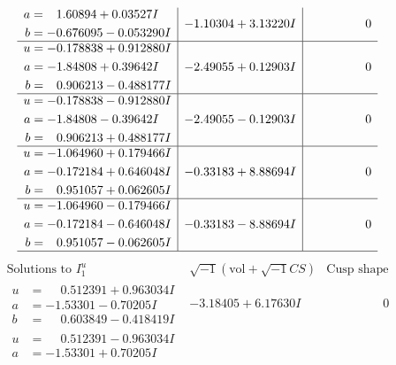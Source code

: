 \documentclass[1p]{elsarticle_modified}
\theoremstyle{definition}
\newcommand{\I}{\sqrt{-1}}
\begin{document}
$$\begin{array}{c|c|c}
\begin{aligned}
a &= \phantom{-}1.60894 + 0.03527 I \\
b &= -0.676095 - 0.053290 I\end{aligned}
 & -1.10304 + 3.13220 I & \phantom{-0.000000 } 0 \\ \hline\begin{aligned}
u &= -0.178838 + 0.912880 I \\
a &= -1.84808 + 0.39642 I \\
b &= \phantom{-}0.906213 - 0.488177 I\end{aligned}
 & -2.49055 + 0.12903 I & \phantom{-0.000000 } 0 \\ \hline\begin{aligned}
u &= -0.178838 - 0.912880 I \\
a &= -1.84808 - 0.39642 I \\
b &= \phantom{-}0.906213 + 0.488177 I\end{aligned}
 & -2.49055 - 0.12903 I & \phantom{-0.000000 } 0 \\ \hline\begin{aligned}
u &= -1.064960 + 0.179466 I \\
a &= -0.172184 + 0.646048 I \\
b &= \phantom{-}0.951057 + 0.062605 I\end{aligned}
 & -0.33183 + 8.88694 I & \phantom{-0.000000 } 0 \\ \hline\begin{aligned}
u &= -1.064960 - 0.179466 I \\
a &= -0.172184 - 0.646048 I \\
b &= \phantom{-}0.951057 - 0.062605 I\end{aligned}
 & -0.33183 - 8.88694 I & \phantom{-0.000000 } 0\\
 \hline 
 \end{array}$$\newpage$$\begin{array}{c|c|c}  
\text{Solutions to }I^u_{1}& \I (\text{vol} + \sqrt{-1}CS) & \text{Cusp shape}\\
 \hline 
\begin{aligned}
u &= \phantom{-}0.512391 + 0.963034 I \\
a &= -1.53301 - 0.70205 I \\
b &= \phantom{-}0.603849 - 0.418419 I\end{aligned}
 & -3.18405 + 6.17630 I & \phantom{-0.000000 } 0 \\ \hline\begin{aligned}
u &= \phantom{-}0.512391 - 0.963034 I \\
a &= -1.53301 + 0.70205 I \\

\end{aligned}
\end{array}$$
\end{document}
